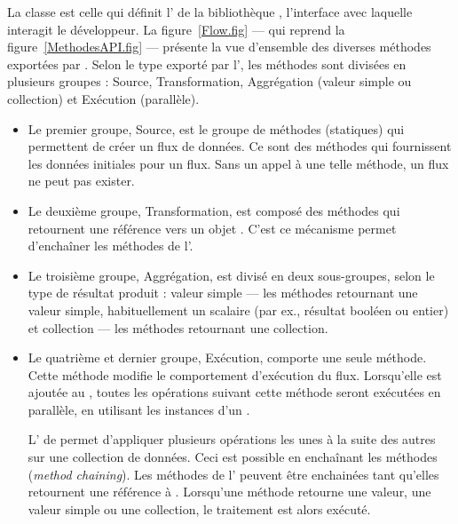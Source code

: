 La classe  est celle qui définit l' de la biblioth\`eque , l'interface avec laquelle interagit le d\'eveloppeur. La figure~\ref{Flow.fig} --- qui reprend la figure~\ref{MethodesAPI.fig} --- pr\'esente la vue d'ensemble des diverses m\'ethodes export\'ees par . Selon le type export\'e par l', les m\'ethodes sont divis\'ees en plusieurs groupes : Source, Transformation, Aggr\'egation (valeur simple ou collection) et Ex\'ecution (parallèle).

\begin{itemize}

\item Le premier groupe, Source, est le groupe de méthodes (statiques) qui permettent de créer un flux de donn\'ees. Ce sont des m\'ethodes qui fournissent les donn\'ees initiales pour un flux. Sans un appel \`a une telle m\'ethode, un flux ne peut pas exister. 

\item Le deuxi\`eme groupe, Transformation, est composé des m\'ethodes qui retournent une r\'ef\'erence vers un objet . C'est ce m\'ecanisme permet d'encha\^iner les m\'ethodes de l'.

\item Le troisi\`eme groupe, Aggr\'egation, est divis\'e en deux sous-groupes, selon le type de r\'esultat produit : valeur simple --- les m\'ethodes retournant une valeur simple, habituellement un scalaire (par ex., r\'esultat bool\'een ou entier) et collection --- les m\'ethodes retournant une collection.

\item Le quatrième et dernier groupe, Exécution, comporte une seule m\'ethode. Cette m\'ethode modifie le comportement d'ex\'ecution du flux. Lorsqu'elle est ajout\'ee au  , toutes les op\'erations suivant cette m\'ethode seront ex\'ecut\'ees en parall\`ele, en utilisant les instances d'un  .

L' de  permet d'appliquer plusieurs op\'erations les unes à la suite des autres sur une collection de donn\'ees. Ceci est possible en encha\^inant les m\'ethodes (\emph{method chaining}). Les m\'ethodes de l' peuvent \^etre enchain\'ees tant qu'elles retournent une r\'ef\'erence \`a . Lorsqu'une m\'ethode retourne une valeur, une valeur simple ou une collection, le traitement est alors ex\'ecut\'e. 

\end{itemize}





